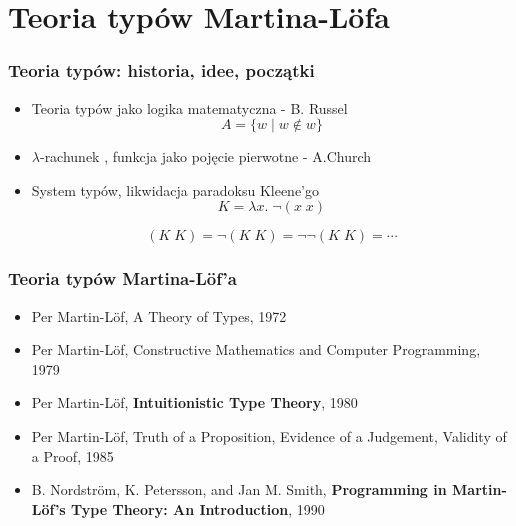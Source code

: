\documentclass{beamer}
\begin{document}
\section{Teoria typów Martina-L\"{o}fa}

\begin{frame}
\frametitle{Teoria typów: historia, idee, początki}

\begin{itemize}
 \item Teoria typów jako logika matematyczna - B. Russel
 \[
  A = \{ w \mid w \not\in w \}
 \]
 \item $\lambda$-rachunek , funkcja jako pojęcie pierwotne  - A.Church
 \item System typów, likwidacja paradoksu Kleene'go
\[
 K = \lambda x.\; \neg (x\; x)
\]

\[
 (K\; K) = \neg (K\; K) = \neg \neg (K\; K) = \cdots
\]

\end{itemize}


\end{frame}


\begin{frame}
\frametitle{Teoria typów Martina-L\"{o}f'a}

\begin{itemize}
\item Per Martin-L\"{o}f, A Theory of Types, 1972
\item Per Martin-L\"{o}f, Constructive Mathematics and Computer Programming, 1979
\item Per Martin-L\"{o}f, \textbf{Intuitionistic Type Theory}, 1980
\item Per Martin-L\"{o}f, Truth of a Proposition, Evidence of a Judgement, Validity of a Proof, 1985
\item B. Nordstr\"{o}m, K. Petersson, and Jan M. Smith, \textbf{ Programming in Martin-L\"{o}f's Type Theory: An Introduction}, 1990
\end{itemize}

\end{frame}
\end{document}
